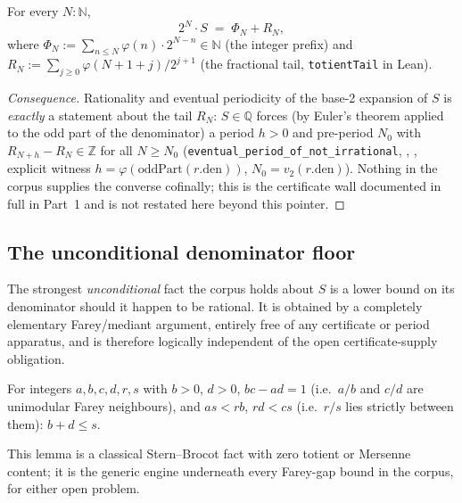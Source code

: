 \begin{prop}
\label{prop:shift}
For every $N : \mathbb{N}$,
\[
2^{N} \cdot S \;=\; \Phi_N + R_N,
\]
where $\Phi_N := \sum_{n \le N} \varphi(n) \cdot 2^{N-n} \in \mathbb{N}$ (the
integer prefix) and $R_N := \sum_{j \ge 0} \varphi(N+1+j)/2^{j+1}$ (the
fractional tail, \texttt{totientTail} in Lean).
  
\end{prop}

\begin{proof}[Consequence]
Rationality and eventual periodicity of the base-2 expansion of $S$ is
\emph{exactly} a statement about the tail $R_N$: $S \in \mathbb{Q}$ forces
(by Euler's theorem applied to the odd part of the denominator) a period
$h>0$ and pre-period $N_0$ with $R_{N+h}-R_N \in \mathbb{Z}$ for all
$N \ge N_0$ (\texttt{eventual_period_of_not_irrational},
,
, explicit witness $h=\varphi(\mathrm{oddPart}(r.\mathrm{den}))$,
$N_0=v_2(r.\mathrm{den})$). Nothing in the corpus supplies the converse
cofinally; this is the certificate wall documented in full in Part~1 and is
not restated here beyond this pointer.
\end{proof}

\subsection{The unconditional denominator floor}
\label{ssec:farey}

The strongest \emph{unconditional} fact the corpus holds about $S$ is a lower
bound on its denominator should it happen to be rational. It is obtained by a
completely elementary Farey/mediant argument, entirely free of any certificate
or period apparatus, and is therefore logically independent of the open
certificate-supply obligation.

\begin{lem}
\label{lem:farey}
For integers $a,b,c,d,r,s$ with $b>0$, $d>0$, $bc-ad=1$ (i.e.\ $a/b$ and
$c/d$ are unimodular Farey neighbours), and $as < rb$, $rd < cs$ (i.e.\ $r/s$
lies strictly between them): $b+d \le s$.
  
\end{lem}

This lemma is a classical Stern--Brocot fact with zero totient or Mersenne
content; it is the generic engine underneath every Farey-gap bound in the
corpus, for either open problem.


